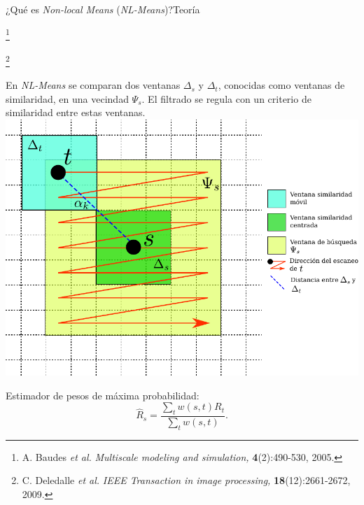 \documentclass[fleqn,10pt]{beamer}
\newcommand\blfootnote[1]{%
	\begingroup
	\renewcommand\thefootnote{}\footnote{#1}%
	\addtocounter{footnote}{-1}%
	\endgroup
}
\begin{document}
\begin{frame}{¿Qué es \emph{Non-local Means} (\emph{NL-Means})?}{Teoría}
	
\blfootnote{{\tiny 	A. Baudes \emph{et al.} \emph{Multiscale modeling and simulation,} \textbf{4}(2):490-530, 2005.}}  \blfootnote{{\tiny C. Deledalle \emph{et al.} \emph{IEEE Transaction in image processing,} \textbf{18}(12):2661-2672, 2009.}}

	
	\vspace*{-1cm}
	\begin{multicols}{2}
		\vfill
		{\footnotesize En \emph{NL-Means} se comparan dos ventanas $\Delta_s$ y $\Delta_t$, conocidas como ventanas de similaridad, en una vecindad $\Psi_s$. El filtrado se regula con un criterio de similaridad entre estas ventanas. }
		\vfill
		\includegraphics[width=1\linewidth]{AAUgraphics/pt3/patches} 
		\newpage
		\pause
		
		{\footnotesize Estimador de pesos de máxima probabilidad:}
		{\scriptsize \begin{equation*}
			\hat{R}_s = \frac{\sum_t w(s,t) R_t}{\sum_t w(s,t)}.
			\end{equation*}}
		

\end{multicols}
\end{frame}
\end{document}
